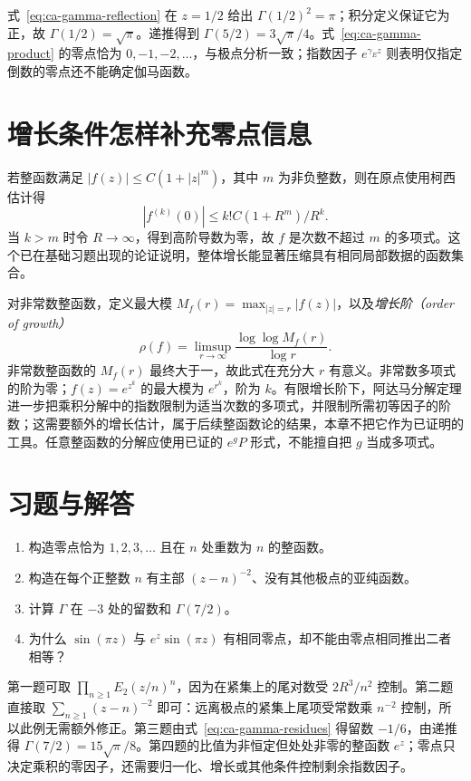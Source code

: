 \begin{example}[半整数值与零点数据]
式~\eqref{eq:ca-gamma-reflection} 在 $z=1/2$ 给出 $\Gamma(1/2)^2=\pi$；积分定义保证它为正，故 $\Gamma(1/2)=\sqrt\pi$。递推得到 $\Gamma(5/2)=3\sqrt\pi/4$。式~\eqref{eq:ca-gamma-product} 的零点恰为 $0,-1,-2,\ldots$，与极点分析一致；指数因子 $e^{\gamma_E z}$ 则表明仅指定倒数的零点还不能确定伽马函数。
\end{example}

\section{增长条件怎样补充零点信息}

若整函数满足 $|f(z)|\le C(1+|z|^m)$，其中 $m$ 为非负整数，则在原点使用柯西估计得
\[
 |f^{(k)}(0)|\le k!C(1+R^m)/R^k.
\]
当 $k>m$ 时令 $R\to\infty$，得到高阶导数为零，故 $f$ 是次数不超过 $m$ 的多项式。这个已在基础习题出现的论证说明，整体增长能显著压缩具有相同局部数据的函数集合。

对非常数整函数，定义最大模 $M_f(r)=\max_{|z|=r}|f(z)|$，以及\emph{增长阶（order of growth）}
\[
 \rho(f)=\limsup_{r\to\infty}\frac{\log\log M_f(r)}{\log r}.
\]
非常数整函数的 $M_f(r)$ 最终大于一，故此式在充分大 $r$ 有意义。非常数多项式的阶为零；$f(z)=e^{z^k}$ 的最大模为 $e^{r^k}$，阶为 $k$。有限增长阶下，阿达马分解定理进一步把乘积分解中的指数限制为适当次数的多项式，并限制所需初等因子的阶数；这需要额外的增长估计，属于后续整函数论的结果，本章不把它作为已证明的工具。任意整函数的分解应使用已证的 $e^gP$ 形式，不能擅自把 $g$ 当成多项式。

\section{习题与解答}

\begin{enumerate}
 \item 构造零点恰为 $1,2,3,\ldots$ 且在 $n$ 处重数为 $n$ 的整函数。
 \item 构造在每个正整数 $n$ 有主部 $(z-n)^{-2}$、没有其他极点的亚纯函数。
 \item 计算 $\Gamma$ 在 $-3$ 处的留数和 $\Gamma(7/2)$。
 \item 为什么 $\sin(\pi z)$ 与 $e^z\sin(\pi z)$ 有相同零点，却不能由零点相同推出二者相等？
\end{enumerate}
\begin{solve}[解答]
第一题可取 $\prod_{n\ge1}E_2(z/n)^n$，因为在紧集上的尾对数受 $2R^3/n^2$ 控制。第二题直接取 $\sum_{n\ge1}(z-n)^{-2}$ 即可：远离极点的紧集上尾项受常数乘 $n^{-2}$ 控制，所以此例无需额外修正。第三题由式~\eqref{eq:ca-gamma-residues} 得留数 $-1/6$，由递推得 $\Gamma(7/2)=15\sqrt\pi/8$。第四题的比值为非恒定但处处非零的整函数 $e^z$；零点只决定乘积的零因子，还需要归一化、增长或其他条件控制剩余指数因子。
\end{solve}

